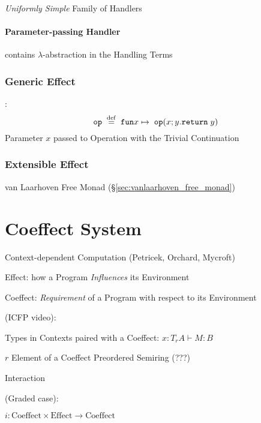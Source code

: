 \emph{Uniformly Simple} Family of Handlers



\paragraph{Parameter-passing Handler}\hfill
\label{sec:parameter_passing_handler}
\cite{plotkin-pretnar13}

contains $\lambda$-abstraction in the Handling Terms



\subsubsection{Generic Effect}\label{sec:generic_effect}

\cite{pretnar15}:
\[
  \mathtt{op}\; \stackrel{\mathrm{def}}{=} \;\mathtt{fun} x \mapsto
  \;\mathtt{op}(x; y.\mathtt{return}\; y)
\]
Parameter $x$ passed to Operation with the Trivial Continuation



\subsubsection{Extensible Effect}\label{sec:extensible_effect}

van Laarhoven Free Monad (\S\ref{sec:vanlaarhoven_free_monad})



\section{Coeffect System}\label{sec:coeffect_system}

Context-dependent Computation (Petricek, Orchard, Mycroft)

Effect: how a Program \emph{Influences} its Environment

Coeffect: \emph{Requirement} of a Program with respect to its
Environment

(ICFP video):

Types in Contexts paired with a Coeffect:
$x : T_r A \vdash M : B$

$r$ Element of a Coeffect Preordered Semiring (???) %

Interaction

(Graded case):

$i : \text{Coeffect} \times \text{Effect} \rightarrow \text{Coeffect}$

